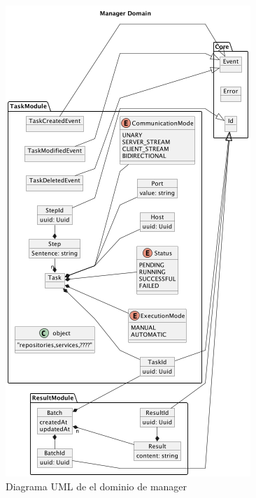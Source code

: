 \begin{figure}[H]
    \centering
    \includegraphics[height=0.4\textheight]{./part/Proyecto_ejecutivo/memoria_descriptiva/descripcionDelProyecto/manager/uml/managerDomain}
    \caption{Diagrama UML de el dominio de manager}\label{fig:Diagrama UML de el dominio de manager}
\end{figure}


